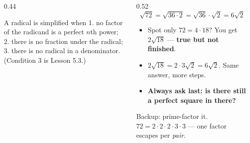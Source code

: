 \documentclass[aspectratio=169, 11pt]{beamer}
\begin{document}
\begin{frame}[t, plain]
  \begin{columns}[T]
    \begin{column}{0.44\textwidth}
      \begin{block}{A radical is simplified when}
        \footnotesize
        1. no factor of the radicand is a perfect $n$th power; \\[3pt]
        2. there is no fraction under the radical; \\[3pt]
        3. there is no radical in a denominator. \\[3pt]
        {\scriptsize (Condition 3 is Lesson 5.3.)}
      \end{block}
    \end{column}
    \begin{column}{0.52\textwidth}
      \[ \sqrt{72}=\sqrt{36\cdot2}=\sqrt{36}\cdot\sqrt2=6\sqrt2 \]
      \vspace{-8pt}
      \footnotesize
      \begin{itemize}\setlength{\itemsep}{4pt}
        \item Spot only $72=4\cdot18$? You get $2\sqrt{18}$ --- \textbf{true but not finished}.
        \item $2\sqrt{18}=2\cdot3\sqrt2=6\sqrt2$. Same answer, more steps.
        \item \textcolor{goldacc}{\textbf{Always ask last: is there still a perfect square in
              there?}}
      \end{itemize}
      \vspace{4pt}
      {\footnotesize Backup: prime-factor it. $72=2\cdot2\cdot2\cdot3\cdot3$ --- one factor escapes
      per \emph{pair}.}
    \end{column}
  \end{columns}
\end{frame}
\end{document}
